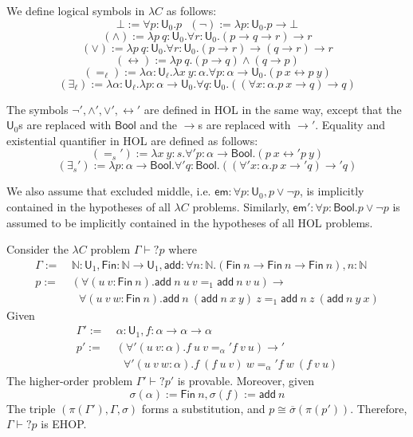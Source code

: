 We define logical symbols in $\lambda C$ as follows:
$$\bot := \forall p : \mathsf{U}_0. p \ \ \ (\neg) := \lambda p : \mathsf{U}_0. p \to \bot$$
$$(\land) := \lambda p \ q : \mathsf{U}_0. \forall r : \mathsf{U}_0. (p \to q \to r) \to r$$
$$(\lor) := \lambda p \ q : \mathsf{U}_0. \forall r : \mathsf{U}_0. (p \to r) \to (q \to r) \to r$$
$$(\leftrightarrow) := \lambda p \ q. (p \to q) \land (q \to p)$$
$$(=_\ell) := \lambda \alpha : \mathsf{U}_\ell. \lambda x \ y : \alpha. \forall p : \alpha \to \mathsf{U}_0. (p \ x \leftrightarrow p \ y)$$
$$(\exists_\ell) := \lambda \alpha : \mathsf{U}_\ell. \lambda p : \alpha \to \mathsf{U}_0. \forall q : \mathsf{U}_0. ((\forall x : \alpha. p \ x \to q) \to q)$$

The symbols $\neg', \land', \lor', \leftrightarrow'$ are defined in HOL in the
same way, except that the $\mathsf{U}_0$s are replaced with $\mathsf{Bool}$ and the $\to$s are
replaced with $\to'$. Equality and existential quantifier in HOL are defined as follows:
$$(=_s') := \lambda x \ y : s. \forall' p : \alpha \to \mathsf{Bool}. (p \ x \leftrightarrow' p \ y)$$
$$(\exists_s') := \lambda p : \alpha \to \mathsf{Bool}. \forall' q : \mathsf{Bool}. ((\forall' x : \alpha. p \ x \to' q) \to' q)$$

We also assume that excluded middle, i.e. $\mathsf{em} : \forall p : \mathsf{U}_0, p \lor \neg p$,
is implicitly contained in the hypotheses of all $\lambda C$ problems. Similarly, $\mathsf{em}' : \forall p : \mathsf{Bool}. p \lor \neg p$
is assumed to be implicitly contained in the hypotheses of all HOL problems.

\begin{example} Consider the $\lambda C$ problem $\Gamma \vdash? p$ where
\begin{align*}
  \Gamma := \ & \mathbb{N} : \mathsf{U}_1, \mathsf{Fin} : \mathbb{N} \to \mathsf{U}_1,
  \mathsf{add} : \forall n : \mathbb{N}. (\mathsf{Fin} \ n \to \mathsf{Fin} \ n \to \mathsf{Fin} \ n), n : \mathbb{N} \\
  p := \ & (\forall (u \ v : \mathsf{Fin} \ n). \mathsf{add} \ n \ u \ v =_1 \mathsf{add} \ n \ v \ u) \to \\
  & \ \ \ \forall (u \ v \ w : \mathsf{Fin} \ n). \mathsf{add} \ n \ (\mathsf{add} \ n \ x \ y) \ z =_1 \mathsf{add} \ n \ z \ (\mathsf{add} \ n \ y \ x)
\end{align*}
Given
\begin{align*}
  \Gamma' := \ & \alpha : \mathsf{U}_1, f : \alpha \to \alpha \to \alpha \\
  p' := \ & (\forall' (u \ v : \alpha). f \ u \ v =_\alpha' f \ v \ u) \to' \\
  & \ \ \ \forall' (u \ v \ w : \alpha). f \ (f \ u \ v) \ w =_\alpha' f \ w \ (f \ v \ u)
\end{align*}
The higher-order problem $\Gamma' \vdash? p'$ is provable. Moreover, given
$$\sigma(\alpha) := \mathsf{Fin} \ n, \sigma(f) := \mathsf{add} \ n$$
The triple $(\pi(\Gamma'), \Gamma, \sigma)$ forms a substitution, and $p \cong \overline{\sigma}(\pi(p'))$.
Therefore, $\Gamma \vdash? p$ is EHOP.
\end{example}

